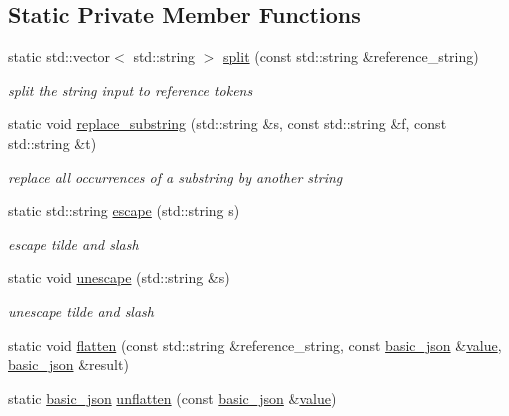 \subsection*{Static Private Member Functions}
\begin{DoxyCompactItemize}
\item 
\hypertarget{classnlohmann_1_1basic__json_1_1json__pointer_a87258899fbf7b9d8b4effe28e4d88e04}{}\label{classnlohmann_1_1basic__json_1_1json__pointer_a87258899fbf7b9d8b4effe28e4d88e04} 
static std\+::vector$<$ std\+::string $>$ \hyperlink{classnlohmann_1_1basic__json_1_1json__pointer_a87258899fbf7b9d8b4effe28e4d88e04}{split} (const std\+::string \&reference\+\_\+string)
\begin{DoxyCompactList}\small\item\em split the string input to reference tokens \end{DoxyCompactList}\item 
static void \hyperlink{classnlohmann_1_1basic__json_1_1json__pointer_a414bce1ecc972c4f036f6edd021c70cf}{replace\+\_\+substring} (std\+::string \&s, const std\+::string \&f, const std\+::string \&t)
\begin{DoxyCompactList}\small\item\em replace all occurrences of a substring by another string \end{DoxyCompactList}\item 
\hypertarget{classnlohmann_1_1basic__json_1_1json__pointer_aaa37857c1f355ad1f67ffe76215897ed}{}\label{classnlohmann_1_1basic__json_1_1json__pointer_aaa37857c1f355ad1f67ffe76215897ed} 
static std\+::string \hyperlink{classnlohmann_1_1basic__json_1_1json__pointer_aaa37857c1f355ad1f67ffe76215897ed}{escape} (std\+::string s)
\begin{DoxyCompactList}\small\item\em escape tilde and slash \end{DoxyCompactList}\item 
\hypertarget{classnlohmann_1_1basic__json_1_1json__pointer_adfdb6c0cd2a62ff0ee108f2c09d3598b}{}\label{classnlohmann_1_1basic__json_1_1json__pointer_adfdb6c0cd2a62ff0ee108f2c09d3598b} 
static void \hyperlink{classnlohmann_1_1basic__json_1_1json__pointer_adfdb6c0cd2a62ff0ee108f2c09d3598b}{unescape} (std\+::string \&s)
\begin{DoxyCompactList}\small\item\em unescape tilde and slash \end{DoxyCompactList}\item 
static void \hyperlink{classnlohmann_1_1basic__json_1_1json__pointer_a1c1baaa26120bac0a5d553eac1dae507}{flatten} (const std\+::string \&reference\+\_\+string, const \hyperlink{classnlohmann_1_1basic__json}{basic\+\_\+json} \&\hyperlink{classnlohmann_1_1basic__json_a407e73a037e6e3067ef7aa2c25a79f39}{value}, \hyperlink{classnlohmann_1_1basic__json}{basic\+\_\+json} \&result)
\item 
static \hyperlink{classnlohmann_1_1basic__json}{basic\+\_\+json} \hyperlink{classnlohmann_1_1basic__json_1_1json__pointer_a16cb91da82183ec5e87d90b4599591b2}{unflatten} (const \hyperlink{classnlohmann_1_1basic__json}{basic\+\_\+json} \&\hyperlink{classnlohmann_1_1basic__json_a407e73a037e6e3067ef7aa2c25a79f39}{value})
\end{DoxyCompactItemize}
